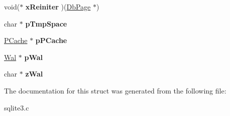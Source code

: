 \begin{DoxyCompactItemize}
\item 
void($\ast$ {\bfseries x\+Reiniter} )(\hyperlink{structPgHdr}{Db\+Page} $\ast$)\hypertarget{structPager_ad214904b953afe7d4718a713fedb8c98}{}\label{structPager_ad214904b953afe7d4718a713fedb8c98}

\item 
char $\ast$ {\bfseries p\+Tmp\+Space}\hypertarget{structPager_a64934188c72599e0be9ae54d3fc1cc92}{}\label{structPager_a64934188c72599e0be9ae54d3fc1cc92}

\item 
\hyperlink{structPCache}{P\+Cache} $\ast$ {\bfseries p\+P\+Cache}\hypertarget{structPager_ae2495e45e354e92a858144386f91cab3}{}\label{structPager_ae2495e45e354e92a858144386f91cab3}

\item 
\hyperlink{structWal}{Wal} $\ast$ {\bfseries p\+Wal}\hypertarget{structPager_a2c759424108248d8b08e6f400fab14dd}{}\label{structPager_a2c759424108248d8b08e6f400fab14dd}

\item 
char $\ast$ {\bfseries z\+Wal}\hypertarget{structPager_ac63ab281e48f9ac8521b85c1a90475b3}{}\label{structPager_ac63ab281e48f9ac8521b85c1a90475b3}

\end{DoxyCompactItemize}


The documentation for this struct was generated from the following file\+:\begin{DoxyCompactItemize}
\item 
sqlite3.\+c\end{DoxyCompactItemize}
